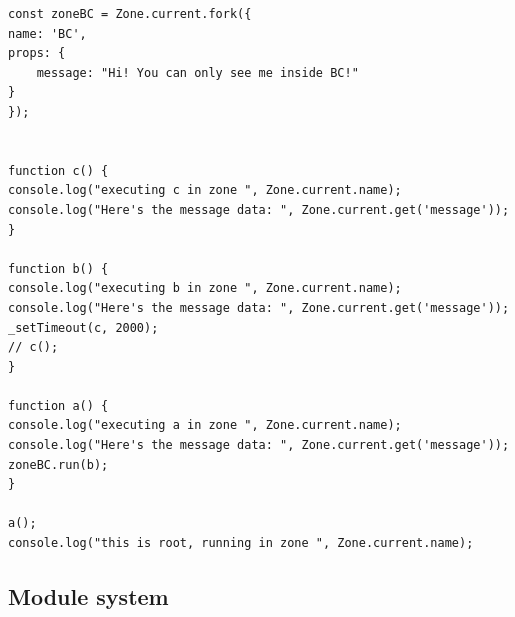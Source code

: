 \begin{lstlisting}
const zoneBC = Zone.current.fork({
name: 'BC',
props: {
    message: "Hi! You can only see me inside BC!"
}
});


function c() {
console.log("executing c in zone ", Zone.current.name);
console.log("Here's the message data: ", Zone.current.get('message'));
}

function b() {
console.log("executing b in zone ", Zone.current.name);
console.log("Here's the message data: ", Zone.current.get('message'));
_setTimeout(c, 2000);
// c();
}

function a() {
console.log("executing a in zone ", Zone.current.name);
console.log("Here's the message data: ", Zone.current.get('message'));
zoneBC.run(b);
}

a();
console.log("this is root, running in zone ", Zone.current.name);
\end{lstlisting}

\subsection{Module system}



